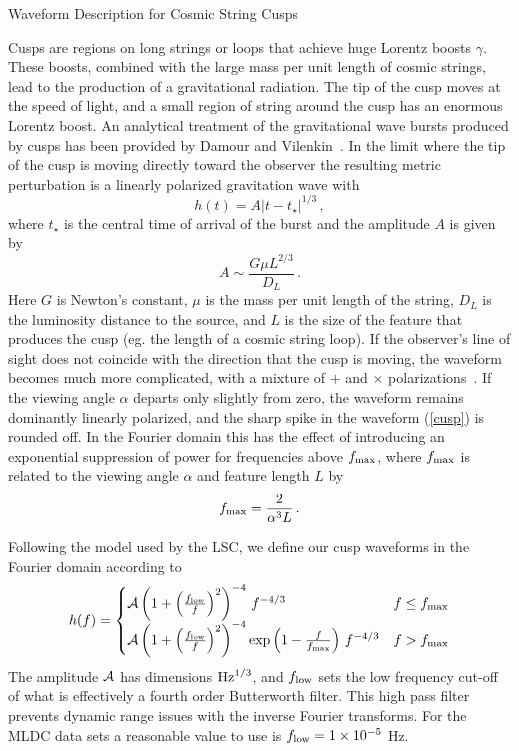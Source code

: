 \documentclass[12pt]{article}
\begin{document}
 

\centerline{\Large{Waveform Description for Cosmic String Cusps}}

\bigskip

Cusps are regions on long strings or loops that achieve huge Lorentz
boosts $\gamma$.
These boosts, combined with the large mass per unit length of cosmic
strings, lead to the production of a gravitational radiation. The tip of
the cusp moves at the speed of light, and a small region of string
around the cusp has an enormous Lorentz boost. An analytical treatment
of the gravitational wave bursts produced by cusps has been provided
by Damour and Vilenkin~\cite{cusp1}. In the limit where the tip of the
cusp is moving directly toward the observer the resulting
metric perturbation is a linearly polarized gravitation wave with
\begin{equation}\label{cusp}
h(t) = A \vert t - t_\star \vert^{1/3} \, ,
\end{equation}
where $t_\star$ is the central time of arrival of the burst and the
amplitude $A$ is given by~\cite{cusp2}
\begin{equation}
A \sim \frac{G \mu L^{2/3}}{D_L} \, .
\end{equation}
Here $G$ is Newton's constant, $\mu$ is the mass per unit length of the
string, $D_L$ is the luminosity distance to the source, and $L$
is the size of the feature that produces the cusp (eg. the length of
a cosmic string loop). If the observer's line of sight does not coincide
with the direction that the cusp is moving, the waveform becomes much more
complicated, with a mixture of $+$ and $\times$
polarizations~\cite{cusp3}. If the viewing angle $\alpha$ departs
only slightly from zero, the waveform remains dominantly linearly
polarized, and the sharp spike in the waveform (\ref{cusp}) is rounded
off. In the Fourier domain this has the effect of introducing an
exponential suppression of power for frequencies above $f_{\rm max}$,
where $f_{\rm max}$ is related to the viewing angle $\alpha$ and
feature length $L$ by
\begin{equation}
f_{\rm max} = \frac{2}{\alpha^3 L} \, .
\end{equation}

Following the model used by the LSC, we define our cusp waveforms
in the Fourier domain according to
\begin{equation}
h(f) =
\begin{cases} 
{\cal A} \left(1 + \left(\frac{f_{\rm low}}{f}\right)^2\right)^{-4}
\, f^{-4/3}  & f \leq f_{\rm max} \\
{\cal A} \left(1 + \left(\frac{f_{\rm low}}{f}\right)^2\right)^{-4}
\exp\left( 1 - \frac{f}{f_{\rm max}}\right) \, f^{-4/3}& f > f_{\rm max}
\end{cases}
\end{equation}
The amplitude ${\cal A}$ has dimensions ${\rm Hz}^{1/3}$, and $f_{\rm low}$
sets the low frequency cut-off of what is effectively a fourth order
Butterworth filter. This high pass filter prevents dynamic range issues
with the inverse Fourier transforms. For the MLDC data sets a reasonable
value to use is $f_{\rm low} = 1 \times 10^{-5}$ Hz.
\end{document}
